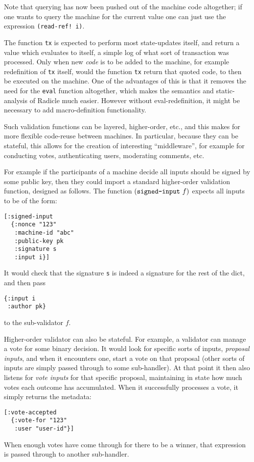 \documentclass[a4paper, oneside, 10pt]{amsart}
\begin{document}
Note that querying has now been pushed out of the machine code altogether; if
one wants to query the machine for the current value one can just use the
expression \texttt{(read-ref! i)}.

The function \texttt{tx} is expected to perform most state-updates itself, and
return a value which evaluates to itself, a simple log of what sort of
transaction was processed. Only when new \emph{code} is to be added to the
machine, for example redefinition of \texttt{tx} itself, would the function
\texttt{tx} return that quoted code, to then be executed on the machine. One of
the advantages of this is that it removes the need for the \texttt{eval}
function altogether, which makes the semantics and static-analysis of Radicle
much easier. However without eval-redefinition, it might be necessary to add
macro-definition functionality.

Such validation functions can be layered, higher-order, etc., and this makes for
more flexible code-reuse between machines. In particular, because they can be
stateful, this allows for the creation of interesting ``middleware'', for
example for conducting votes, authenticating users, moderating comments, etc.

For example if the participants of a machine decide all inputs should be signed
by some public key, then they could import a standard higher-order validation
function, designed as follows. The function $(\text{\texttt{signed-input}} \ f)$
expects all inputs to be of the form:
\begin{lstlisting}
[:signed-input
  {:nonce "123"
   :machine-id "abc"
   :public-key pk
   :signature s
   :input i}]
\end{lstlisting}
It would check that the signature \texttt{s} is indeed a signature for
the rest of the dict, and then pass
\begin{lstlisting}
{:input i
 :author pk}
\end{lstlisting}
to the sub-validator $f$.

Higher-order validator can also be stateful. For example, a validator can manage
a vote for some binary decision. It would look for specific sorts of inputs,
\emph{proposal inputs}, and when it encounters one, start a vote on that
proposal (other sorts of inputs are simply passed through to some
sub-handler). At that point it then also listens for \emph{vote inputs} for that
specific proposal, maintaining in state how much votes each outcome has
accumulated. When it successfully processes a vote, it simply returns the
metadata:
\begin{lstlisting}
[:vote-accepted
  {:vote-for "123"
   :user "user-id"}]
\end{lstlisting}
When enough votes have come through for there to be a winner, that expression is
passed through to another sub-handler.
\end{document}
